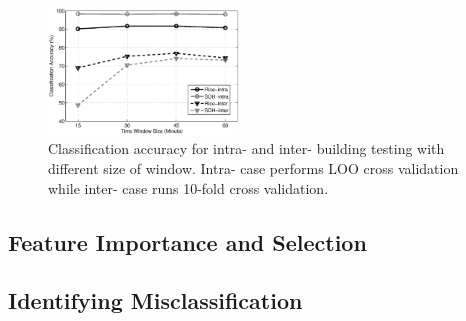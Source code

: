 \begin{figure}[h!]
\centering
	\includegraphics[width=0.45\textwidth]{./fig/window.eps}
\caption{Classification accuracy for intra- and inter- building testing with different size of window. Intra- case performs LOO cross validation while inter- case runs 10-fold cross validation.}
\label{fig:window}
\end{figure}


\subsection{Feature Importance and Selection}

\subsection{Identifying Misclassification}

